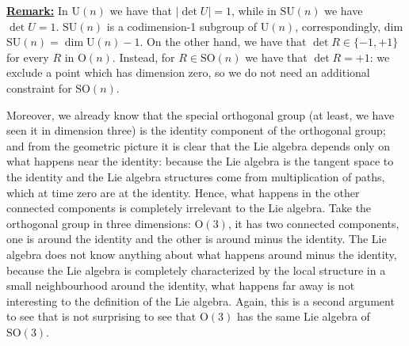 \documentclass[../main.tex]{subfiles}
\begin{document}
\underline{\textbf{Remark:}} In U$(n)$ we have that $|\det U|=1$, while in $\textrm{SU}(n)$ we have $\det U=1$. $\textrm{SU}(n)$ is a codimension-1 subgroup of U$(n)$, correspondingly, dim SU$(n)=\dim \textrm{U}(n)-1$. On the other hand, we have that $\det R\in\{-1,+1\}$ for every $R$ in O$(n)$. Instead, for $R\in\textrm{SO}(n)$ we have that $\det R=+1$: we exclude a point which has dimension zero, so we do not need an additional constraint for $\textrm{SO}(n)$.

Moreover, we already know that the special orthogonal group (at least, we have seen it in dimension three) is the identity component of the orthogonal group; and from the geometric picture it is clear that the Lie algebra depends only on what happens near the identity: because the Lie algebra is the tangent space to the identity and the Lie algebra structures come from multiplication of paths, which at time zero are at the identity. Hence, what happens in the other connected components is completely irrelevant to the Lie algebra. Take the orthogonal group in three dimensions: $\textrm{O}(3)$, it has two connected components, one is around the identity and the other is around minus the identity. The Lie algebra does not know anything about what happens around minus the identity, because the Lie algebra is completely characterized by the local structure in a small neighbourhood around the identity, what happens far away is not interesting to the definition of the Lie algebra. Again, this is a second argument to see that is not surprising to see that $\textrm{O}(3)$ has the same Lie algebra of $\textrm{SO}(3)$.
\end{document}

